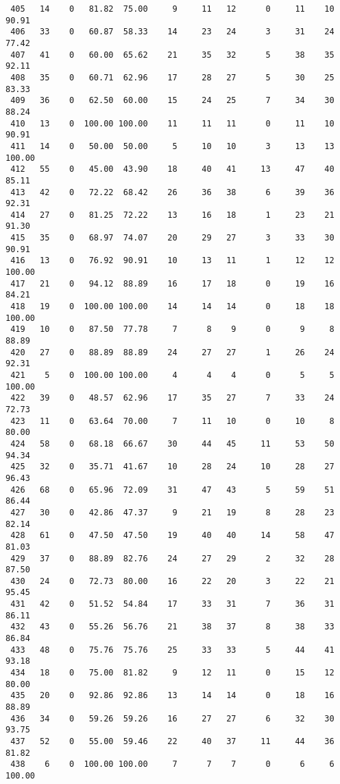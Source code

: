 \begin{verbatim}
 405   14    0   81.82  75.00     9     11   12      0     11    10    90.91
 406   33    0   60.87  58.33    14     23   24      3     31    24    77.42
 407   41    0   60.00  65.62    21     35   32      5     38    35    92.11
 408   35    0   60.71  62.96    17     28   27      5     30    25    83.33
 409   36    0   62.50  60.00    15     24   25      7     34    30    88.24
 410   13    0  100.00 100.00    11     11   11      0     11    10    90.91
 411   14    0   50.00  50.00     5     10   10      3     13    13   100.00
 412   55    0   45.00  43.90    18     40   41     13     47    40    85.11
 413   42    0   72.22  68.42    26     36   38      6     39    36    92.31
 414   27    0   81.25  72.22    13     16   18      1     23    21    91.30
 415   35    0   68.97  74.07    20     29   27      3     33    30    90.91
 416   13    0   76.92  90.91    10     13   11      1     12    12   100.00
 417   21    0   94.12  88.89    16     17   18      0     19    16    84.21
 418   19    0  100.00 100.00    14     14   14      0     18    18   100.00
 419   10    0   87.50  77.78     7      8    9      0      9     8    88.89
 420   27    0   88.89  88.89    24     27   27      1     26    24    92.31
 421    5    0  100.00 100.00     4      4    4      0      5     5   100.00
 422   39    0   48.57  62.96    17     35   27      7     33    24    72.73
 423   11    0   63.64  70.00     7     11   10      0     10     8    80.00
 424   58    0   68.18  66.67    30     44   45     11     53    50    94.34
 425   32    0   35.71  41.67    10     28   24     10     28    27    96.43
 426   68    0   65.96  72.09    31     47   43      5     59    51    86.44
 427   30    0   42.86  47.37     9     21   19      8     28    23    82.14
 428   61    0   47.50  47.50    19     40   40     14     58    47    81.03
 429   37    0   88.89  82.76    24     27   29      2     32    28    87.50
 430   24    0   72.73  80.00    16     22   20      3     22    21    95.45
 431   42    0   51.52  54.84    17     33   31      7     36    31    86.11
 432   43    0   55.26  56.76    21     38   37      8     38    33    86.84
 433   48    0   75.76  75.76    25     33   33      5     44    41    93.18
 434   18    0   75.00  81.82     9     12   11      0     15    12    80.00
 435   20    0   92.86  92.86    13     14   14      0     18    16    88.89
 436   34    0   59.26  59.26    16     27   27      6     32    30    93.75
 437   52    0   55.00  59.46    22     40   37     11     44    36    81.82
 438    6    0  100.00 100.00     7      7    7      0      6     6   100.00

\end{verbatim}
